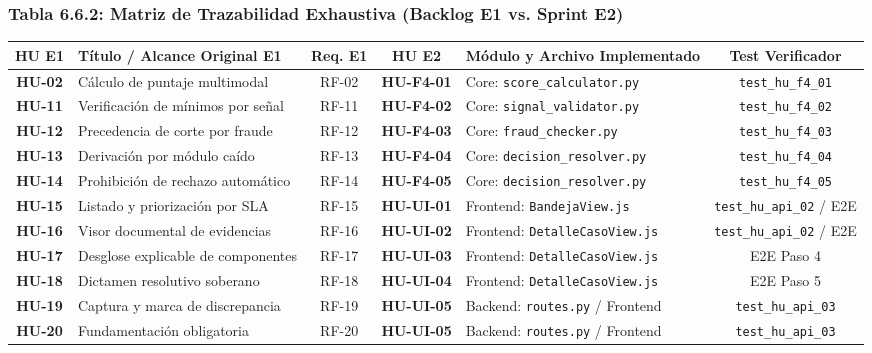 \documentclass[11pt,letterpaper]{article}
\begin{document}
\subsubsection{Tabla 6.6.2: Matriz de Trazabilidad Exhaustiva (Backlog E1 vs. Sprint E2)}

\begin{table}[h]
\centering
\scriptsize
\begin{tabularx}{\textwidth}{c P{3.2cm} c c P{3.8cm} c}
\toprule
\textbf{HU E1} & \textbf{Título / Alcance Original E1} & \textbf{Req. E1} & \textbf{HU E2} & \textbf{Módulo y Archivo Implementado} & \textbf{Test Verificador} \\
\midrule
\textbf{HU-02} & Cálculo de puntaje multimodal & RF-02 & \textbf{HU-F4-01} & Core: \texttt{score\_calculator.py} & \texttt{test\_hu\_f4\_01} \\
\textbf{HU-11} & Verificación de mínimos por señal & RF-11 & \textbf{HU-F4-02} & Core: \texttt{signal\_validator.py} & \texttt{test\_hu\_f4\_02} \\
\textbf{HU-12} & Precedencia de corte por fraude & RF-12 & \textbf{HU-F4-03} & Core: \texttt{fraud\_checker.py} & \texttt{test\_hu\_f4\_03} \\
\textbf{HU-13} & Derivación por módulo caído & RF-13 & \textbf{HU-F4-04} & Core: \texttt{decision\_resolver.py} & \texttt{test\_hu\_f4\_04} \\
\textbf{HU-14} & Prohibición de rechazo automático & RF-14 & \textbf{HU-F4-05} & Core: \texttt{decision\_resolver.py} & \texttt{test\_hu\_f4\_05} \\
\textbf{HU-15} & Listado y priorización por SLA & RF-15 & \textbf{HU-UI-01} & Frontend: \texttt{BandejaView.js} & \texttt{test\_hu\_api\_02} / E2E \\
\textbf{HU-16} & Visor documental de evidencias & RF-16 & \textbf{HU-UI-02} & Frontend: \texttt{DetalleCasoView.js} & \texttt{test\_hu\_api\_02} / E2E \\
\textbf{HU-17} & Desglose explicable de componentes & RF-17 & \textbf{HU-UI-03} & Frontend: \texttt{DetalleCasoView.js} & E2E Paso 4 \\
\textbf{HU-18} & Dictamen resolutivo soberano & RF-18 & \textbf{HU-UI-04} & Frontend: \texttt{DetalleCasoView.js} & E2E Paso 5 \\
\textbf{HU-19} & Captura y marca de discrepancia & RF-19 & \textbf{HU-UI-05} & Backend: \texttt{routes.py} / Frontend & \texttt{test\_hu\_api\_03} \\
\textbf{HU-20} & Fundamentación obligatoria & RF-20 & \textbf{HU-UI-05} & Backend: \texttt{routes.py} / Frontend & \texttt{test\_hu\_api\_03} \\

\end{tabularx}
\end{table}
\end{document}
